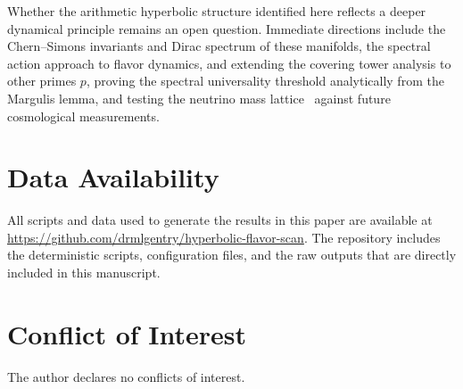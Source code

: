 ﻿\documentclass[12pt]{article}
\theoremstyle{definition}
\begin{document}
Whether the arithmetic hyperbolic structure identified here reflects a deeper dynamical principle remains an open question. Immediate directions include the Chern--Simons invariants and Dirac spectrum of these manifolds, the spectral action approach to flavor dynamics, and extending the covering tower analysis to other primes $p$,
proving the spectral universality threshold analytically from
the Margulis lemma, and testing the neutrino mass lattice~\cite{Gentry:neutrino} against future cosmological measurements.

\section*{Data Availability}
All scripts and data used to generate the results in this paper are available at \url{https://github.com/drmlgentry/hyperbolic-flavor-scan}. The repository includes the deterministic scripts, configuration files, and the raw outputs that are directly included in this manuscript.

\section*{Conflict of Interest}
The author declares no conflicts of interest.
\end{document}
